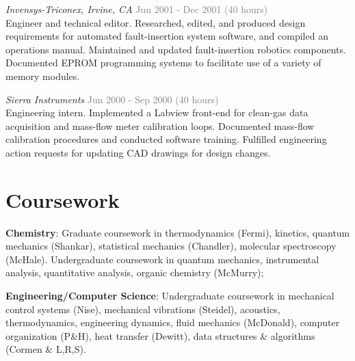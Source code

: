 \documentclass[margin,line]{res}
\begin{document}
\begin{resume}

\emph{Invensys-Triconex, Irvine, CA} \hfill {\textcolor{gray}{Jun 2001 - Dec 2001 (40 hours)}} \\
Engineer and technical editor. Researched, edited, and produced design requirements for automated fault-insertion system software, and compiled an operations manual. Maintained and updated fault-insertion robotics components. Documented EPROM programming systems to facilitate use of a variety of memory modules. 


\emph{Sierra Instruments} \hfill {\textcolor{gray}{Jun 2000 - Sep 2000 (40 hours)}} \\
Engineering intern. Implemented a Labview front-end for clean-gas data acquisition and mass-flow meter calibration loops. Documented mass-flow calibration procedures and conducted software training. Fulfilled engineering action requests for updating CAD drawings for design changes.


\section{\sc Coursework}

\textbf{Chemistry}: Graduate coursework in thermodynamics (Fermi), kinetics, quantum mechanics (Shankar), statistical mechanics (Chandler), molecular spectroscopy (McHale). Undergraduate coursework in quantum mechanics, instrumental analysis, quantitative analysis, organic chemistry (McMurry); 
\vspace*{-.1in}

\textbf{Engineering/Computer Science}: Undergraduate coursework in mechanical control systems (Nise), mechanical vibrations (Steidel), acoustics, thermodynamics, engineering dynamics, fluid mechanics (McDonald), computer organization (P\&H), heat transfer (Dewitt), data structures \& algorithms (Cormen \& L,R,S). 


\end{resume}
\end{document}
